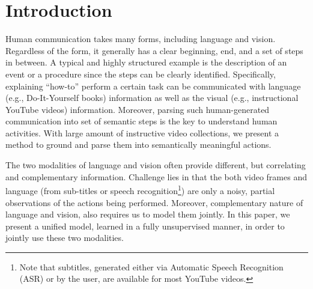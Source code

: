 
\section{Introduction}
Human communication takes many forms, including language and vision. Regardless of the form, it generally has a clear beginning, end, and a set of steps in between. A typical and highly structured example is the description of an event or a procedure since the steps can be clearly identified. Specifically, explaining ``how-to'' perform a certain task can be communicated with language (e.g., Do-It-Yourself books) information as well as the visual (e.g., instructional YouTube videos) information. Moreover, parsing such human-generated communication into set of semantic steps is the key to understand human activities. With large amount of instructive video collections, we present a method to ground and parse them into semantically meaningful actions.



%

The two modalities of language and vision often provide different, but correlating and complementary information. Challenge lies in that the both video frames and language (from sub-titles or speech recognition\footnote{Note that subtitles, generated either via Automatic Speech Recognition (ASR) or by the user, are available for most YouTube videos.}) are only a noisy, partial observations of the actions being performed. Moreover, complementary nature of language and vision, also requires us to model them jointly. In this paper, we present a unified model, learned in a fully unsupervised manner, in order to jointly use these two modalities.




